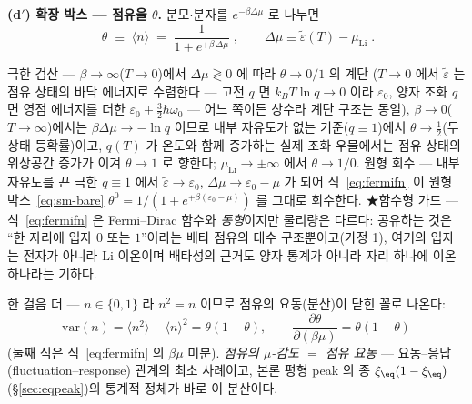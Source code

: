 \textbf{(d$'$) 확장 박스 --- 점유율 $\theta$.} 분모$\cdot$분자를 $e^{-\beta\Delta\mu}$ 로 나누면
\begin{equation}
\boxed{\;\theta\;\equiv\;\langle n\rangle\;=\;\frac{1}{1+e^{+\beta\,\Delta\mu}}\;,
\qquad \Delta\mu\equiv\tilde\varepsilon(T)-\mu_\mathrm{Li}\;.}
\label{eq:fermifn}
\end{equation}
\begin{verifybox}
극한 검산 --- $\beta\to\infty$($T\to0$)에서 $\Delta\mu\gtrless0$ 에 따라 $\theta\to0/1$ 의 계단
($T\to0$ 에서 $\tilde\varepsilon$ 는 점유 상태의 바닥 에너지로 수렴한다 --- 고전 $q$ 면 $k_BT\ln q\to0$
이라 $\varepsilon_0$, 양자 조화 $q$ 면 영점 에너지를 더한 $\varepsilon_0+\tfrac32\hbar\omega_0$ --- 어느
쪽이든 상수라 계단 구조는 동일), $\beta\to0$($T\to\infty$)에서는 $\beta\Delta\mu\to-\ln q$ 이므로 내부
자유도가 없는 기준($q\equiv1$)에서 $\theta\to\tfrac12$(두 상태 등확률)이고, $q(T)$ 가 온도와 함께 증가하는
실제 조화 우물에서는 점유 상태의 위상공간 증가가 이겨 $\theta\to1$ 로 향한다; $\mu_\mathrm{Li}\to\pm\infty$
에서 $\theta\to1/0$. 원형 회수 --- 내부 자유도를 끈 극한 $q\equiv1$ 에서 $\tilde\varepsilon\to\varepsilon_0$,
$\Delta\mu\to\varepsilon_0-\mu$ 가 되어 식~\eqref{eq:fermifn} 이 원형 박스~\eqref{eq:sm-bare}
$\theta^{0}=1/(1+e^{+\beta(\varepsilon_0-\mu)})$ 를 그대로 회수한다. ★함수형 가드 --- 식~\eqref{eq:fermifn}
은 Fermi--Dirac 함수와 \emph{동형}이지만 물리량은 다르다: 공유하는 것은 ``한 자리에 입자 $0$ 또는 $1$''이라는
배타 점유의 대수 구조뿐이고(가정 1), 여기의 입자는 전자가 아니라 Li 이온이며 배타성의 근거도 양자 통계가
아니라 자리 하나에 이온 하나라는 기하다.
\end{verifybox}

한 걸음 더 --- $n\in\{0,1\}$ 라 $n^2=n$ 이므로 점유의 요동(분산)이 닫힌 꼴로 나온다:
\begin{equation}
\mathrm{var}(n)=\langle n^2\rangle-\langle n\rangle^2=\theta(1-\theta),
\qquad
\frac{\partial\theta}{\partial(\beta\mu)}=\theta(1-\theta)
\label{eq:sm-flucres}
\end{equation}
(둘째 식은 식~\eqref{eq:fermifn} 의 $\beta\mu$ 미분). \emph{점유의 $\mu$-감도 $=$ 점유 요동} --- 요동--응답
(fluctuation--response) 관계의 최소 사례이고, 본론 평형 peak 의 종 $\xi_\eq(1-\xi_\eq)$(\S\ref{sec:eqpeak})의
통계적 정체가 바로 이 분산이다.

